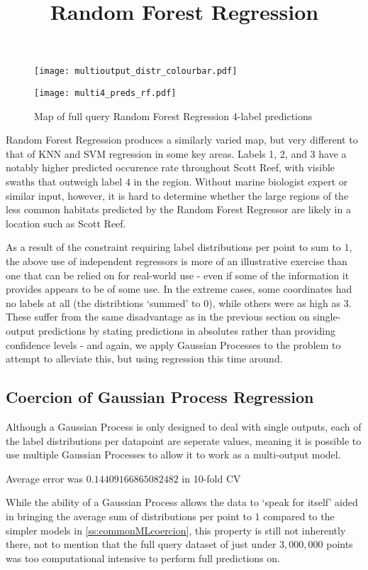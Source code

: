 \begin{figure}[H]
    \title{\large{\textbf{Random Forest Regression}}}
    \centerline{\texttt{[image: multioutput\_distr\_colourbar.pdf]}}
    \centerline{\texttt{[image: multi4\_preds\_rf.pdf]}}
    \caption{Map of full query Random Forest Regression 4-label predictions}
    \label{fig:multi4_rf}
\end{figure}

Random Forest Regression produces a similarly varied map, but very different to that of KNN and SVM regression in some key areas. Labels 1, 2, and 3 have a notably higher predicted occurence rate throughout Scott Reef, with visible swaths that outweigh label $4$ in the region. Without marine biologist expert or similar input, however, it is hard to determine whether the large regions of the less common habitats predicted by the Random Forest Regressor are likely in a location such as Scott Reef.

As a result of the constraint requiring label distributions per point to sum to $1$, the above use of independent regressors is more of an illustrative exercise than one that can be relied on for real-world use - even if some of the information it provides appears to be of some use. In the extreme cases, some coordinates had no labels at all (the distribtions `summed' to $0$), while others were as high as $3$. These suffer from the same disadvantage as in the previous section on single-output predictions by stating predictions in absolutes rather than providing confidence levels - and again, we apply Gaussian Processes to the problem to attempt to alleviate this, but using regression this time around.

\subsection{Coercion of Gaussian Process Regression}
Although a Gaussian Process is only designed to deal with single outputs, each of the label distributions per datapoint are seperate values, meaning it is possible to use multiple Gaussian Processes to allow it to work as a multi-output model. 

Average error was $0.14409166865082482$ in 10-fold CV 

While the ability of a Gaussian Process allows the data to `speak for itself' aided in bringing the average sum of distributions per point to $1$ compared to the simpler models in \ref{ss:commonMLcoercion}, this property is still not inherently there, not to mention that the full query dataset of just under $3,000,000$ points was too computational intensive to perform full predictions on.

